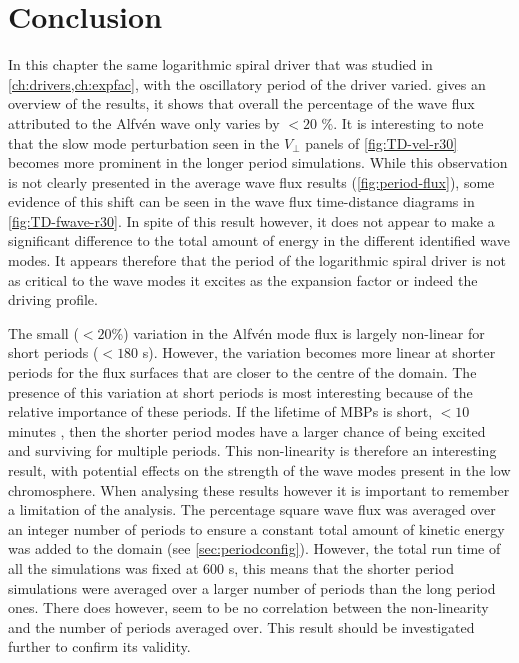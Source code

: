 \documentclass[a4paper,12pt,fourier,authoryear,custommargin]{Classes/PhDThesisPSnPDF}
\begin{document}
\section{Conclusion}\label{sec:conclusion}

In this chapter the same logarithmic spiral driver that was studied in \cref{ch:drivers,ch:expfac}, with the oscillatory period of the driver varied.
 gives an overview of the results, it shows that overall the percentage of the wave flux attributed to the Alfv\'en wave only varies by $<20$ \%.
It is interesting to note that the slow mode perturbation seen in the $V_\perp$ panels of \cref{fig:TD-vel-r30} becomes more prominent in the longer period simulations.
While this observation is not clearly presented in the average wave flux results (\cref{fig:period-flux}), some evidence of this shift can be seen in the wave flux time-distance diagrams in \cref{fig:TD-fwave-r30}.
In spite of this result however, it does not appear to make a significant difference to the total amount of energy in the different identified wave modes.
It appears therefore that the period of the logarithmic spiral driver is not as critical to the wave modes it excites as the expansion factor or indeed the driving profile.

The small ($<20$\%) variation in the Alfv\'en mode flux is largely non-linear for short periods ($<180$ s).
However, the variation becomes more linear at shorter periods for the flux surfaces that are closer to the centre of the domain.
The presence of this variation at short periods is most interesting because of the relative importance of these periods.
If the lifetime of MBPs is short, $<10$ minutes \citep{sanchezalmeida2004}, then the shorter period modes have a larger chance of being excited and surviving for multiple periods.
This non-linearity is therefore an interesting result, with potential effects on the strength of the wave modes present in the low chromosphere.
When analysing these results however it is important to remember a limitation of the analysis.
The percentage square wave flux was averaged over an integer number of periods to ensure a constant total amount of kinetic energy was added to the domain (see \cref{sec:periodconfig}).
However, the total run time of all the simulations was fixed at $600$ s, this means that the shorter period simulations were averaged over a larger number of periods than the long period ones.
There does however, seem to be no correlation between the non-linearity and the number of periods averaged over.
This result should be investigated further to confirm its validity.
\end{document}
